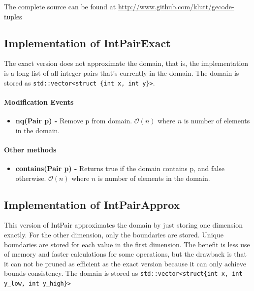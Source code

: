 \documentclass[a4paper,11pt]{article}
\begin{document}
The complete source can be found at \url{http://www.github.com/klutt/gecode-tuples}

\subsection{Implementation of IntPairExact}
The exact version does not approximate the domain, that is, the implementation is a long list of all integer pairs that's currently in the domain. The domain is stored as \texttt{std::vector<struct \{int x, int y\}>}. 

\paragraph{Modification Events}
\begin{itemize}
\item {\textbf{nq(Pair p) - }} Remove p from domain. $\mathcal{O}(n)$ where $n$ is number of elements in the domain.
\end{itemize}

\paragraph{Other methods}
\begin{itemize}
\item {\textbf{contains(Pair p) - }} Returns true if the domain contains p, and false otherwise. $\mathcal{O}(n)$ where $n$ is number of elements in the domain.
\end{itemize}

\subsection{Implementation of IntPairApprox}
\label{sec:impapprox}
This version of IntPair approximates the domain by just storing one dimension exactly. For the other dimension, only the boundaries are stored. Unique boundaries are stored for each value in the first dimension. The benefit is less use of memory and faster calculations for some operations, but the drawback is that it can not be pruned as efficient as the exact version because it can only achieve bounds consistency. The domain is stored as \texttt{std::vector<struct\{int x, int y\_low, int y\_high\}>}
\end{document}
